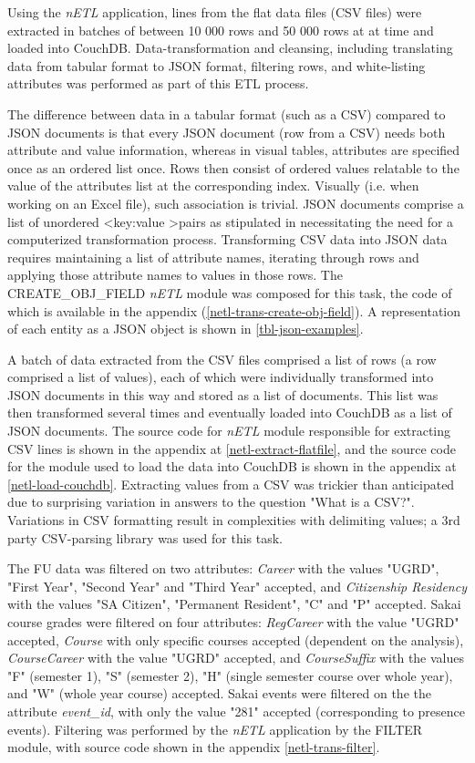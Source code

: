 Using the \textit{nETL} application, lines from the flat data files (CSV files) were extracted in batches of between 10 000 rows and 50 000 rows at at time and loaded into CouchDB. Data-transformation and cleansing, including translating data from tabular format to JSON format, filtering rows, and white-listing attributes was performed as part of this ETL process.

The difference between data in a tabular format (such as a CSV) compared to JSON documents is that every JSON document (row from a CSV) needs both attribute and value information, whereas in visual tables, attributes are specified once as an ordered list once. Rows then consist of ordered values relatable to the value of the attributes list at the corresponding index. Visually (i.e. when working on an Excel file), such association is trivial. JSON documents comprise a list of unordered \textless key:value \textgreater pairs as stipulated in \cite{rfc7159} necessitating the need for a computerized transformation process. Transforming CSV data into JSON data requires maintaining a list of attribute names, iterating through rows and applying those attribute names to values in those rows. The CREATE\_OBJ\_FIELD \textit{nETL} module was composed for this task, the code of which is available in the appendix (\ref{netl-trans-create-obj-field}). A representation of each entity as a JSON object is shown in \ref{tbl-json-examples}.

A batch of data extracted from the CSV files comprised a list of rows (a row comprised a list of values), each of which were individually transformed into JSON documents in this way and stored as a list of documents. This list was then transformed several times and eventually loaded into CouchDB as a list of JSON documents. The source code for \textit{nETL} module responsible for extracting CSV lines is shown in the appendix at \ref{netl-extract-flatfile}, and the source code for the module used to load the data into CouchDB is shown in the appendix at \ref{netl-load-couchdb}. Extracting values from a CSV was trickier than anticipated due to surprising variation in answers to the question "What is a CSV?". Variations in CSV formatting result in complexities with delimiting values; a 3rd party CSV-parsing library was used for this task.

The FU data was filtered on two attributes: \textit{Career} with the values "UGRD", "First Year", "Second Year" and "Third Year" accepted, and \textit{Citizenship Residency} with the values "SA Citizen", "Permanent Resident", "C" and "P" accepted. Sakai course grades were filtered on four attributes: \textit{RegCareer} with the value "UGRD" accepted, \textit{Course} with only specific courses accepted (dependent on the analysis), \textit{CourseCareer} with the value "UGRD" accepted, and \textit{CourseSuffix} with the values "F" (semester 1), "S" (semester 2), "H" (single semester course over whole year), and "W" (whole year course) accepted. Sakai events were filtered on the the attribute \textit{event\_id}, with only the value "281" accepted (corresponding to presence events). Filtering was performed by the \textit{nETL} application by the FILTER module, with source code shown in the appendix \ref{netl-trans-filter}.

